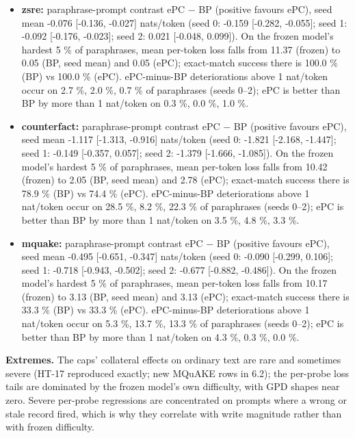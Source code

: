 \documentclass[10pt,a4paper]{article}
\begin{document}
\begin{itemize}
\item \textbf{zsre:} paraphrase-prompt contrast ePC $-$ BP (positive favours ePC), seed mean -0.076 [-0.136, -0.027] nats/token (seed 0: -0.159 [-0.282, -0.055]; seed 1: -0.092 [-0.176, -0.023]; seed 2: 0.021 [-0.048, 0.099]). On the frozen model's hardest 5 \% of paraphrases, mean per-token loss falls from 11.37 (frozen) to 0.05 (BP, seed mean) and 0.05 (ePC); exact-match success there is 100.0 \% (BP) vs 100.0 \% (ePC). ePC-minus-BP deteriorations above 1 nat/token occur on 2.7 \%, 2.0 \%, 0.7 \% of paraphrases (seeds 0–2); ePC is better than BP by more than 1 nat/token on 0.3 \%, 0.0 \%, 1.0 \%.
\item \textbf{counterfact:} paraphrase-prompt contrast ePC $-$ BP (positive favours ePC), seed mean -1.117 [-1.313, -0.916] nats/token (seed 0: -1.821 [-2.168, -1.447]; seed 1: -0.149 [-0.357, 0.057]; seed 2: -1.379 [-1.666, -1.085]). On the frozen model's hardest 5 \% of paraphrases, mean per-token loss falls from 10.42 (frozen) to 2.05 (BP, seed mean) and 2.78 (ePC); exact-match success there is 78.9 \% (BP) vs 74.4 \% (ePC). ePC-minus-BP deteriorations above 1 nat/token occur on 28.5 \%, 8.2 \%, 22.3 \% of paraphrases (seeds 0–2); ePC is better than BP by more than 1 nat/token on 3.5 \%, 4.8 \%, 3.3 \%.
\item \textbf{mquake:} paraphrase-prompt contrast ePC $-$ BP (positive favours ePC), seed mean -0.495 [-0.651, -0.347] nats/token (seed 0: -0.090 [-0.299, 0.106]; seed 1: -0.718 [-0.943, -0.502]; seed 2: -0.677 [-0.882, -0.486]). On the frozen model's hardest 5 \% of paraphrases, mean per-token loss falls from 10.17 (frozen) to 3.13 (BP, seed mean) and 3.13 (ePC); exact-match success there is 33.3 \% (BP) vs 33.3 \% (ePC). ePC-minus-BP deteriorations above 1 nat/token occur on 5.3 \%, 13.7 \%, 13.3 \% of paraphrases (seeds 0–2); ePC is better than BP by more than 1 nat/token on 4.3 \%, 0.3 \%, 0.0 \%.
\end{itemize}



\textbf{Extremes.} The caps' collateral effects on ordinary text are rare and sometimes severe (HT-17 reproduced exactly; new MQuAKE rows in 6.2); the per-probe loss tails are dominated by the frozen model's own difficulty, with GPD shapes near zero. Severe per-probe regressions are concentrated on prompts where a wrong or stale record fired, which is why they correlate with write magnitude rather than with frozen difficulty.
\end{document}
